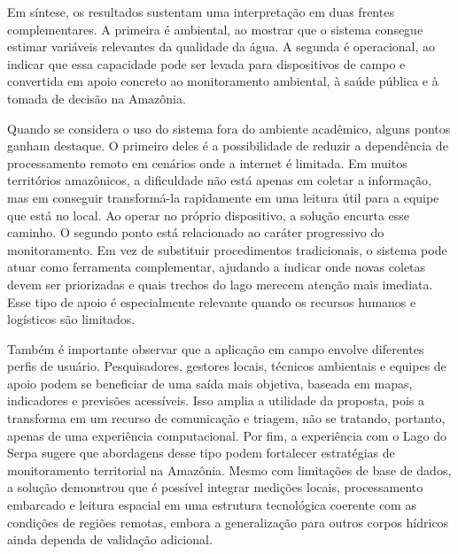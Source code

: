 Em s\'intese, os resultados sustentam uma interpreta\c{c}\~ao em duas frentes complementares. A primeira \'e ambiental, ao mostrar que o sistema consegue estimar vari\'aveis relevantes da qualidade da \'agua. A segunda \'e operacional, ao indicar que essa capacidade pode ser levada para dispositivos de campo e convertida em apoio concreto ao monitoramento ambiental, \`a sa\'ude p\'ublica e \`a tomada de decis\~ao na Amaz\^onia.


Quando se considera o uso do sistema fora do ambiente acad\^emico, alguns pontos ganham destaque. O primeiro deles \'e a possibilidade de reduzir a depend\^encia de processamento remoto em cen\'arios onde a internet \'e limitada. Em muitos territ\'orios amaz\^onicos, a dificuldade n\~ao est\'a apenas em coletar a informa\c{c}\~ao, mas em conseguir transform\'a-la rapidamente em uma leitura \'util para a equipe que est\'a no local. Ao operar no pr\'oprio dispositivo, a solu\c{c}\~ao encurta esse caminho. O segundo ponto est\'a relacionado ao car\'ater progressivo do monitoramento. Em vez de substituir procedimentos tradicionais, o sistema pode atuar como ferramenta complementar, ajudando a indicar onde novas coletas devem ser priorizadas e quais trechos do lago merecem aten\c{c}\~ao mais imediata. Esse tipo de apoio \'e especialmente relevante quando os recursos humanos e log\'isticos s\~ao limitados.

Tamb\'em \'e importante observar que a aplica\c{c}\~ao em campo envolve diferentes perfis de usu\'ario. Pesquisadores, gestores locais, t\'ecnicos ambientais e equipes de apoio podem se beneficiar de uma sa\'ida mais objetiva, baseada em mapas, indicadores e previs\~oes acess\'iveis. Isso amplia a utilidade da proposta, pois a transforma em um recurso de comunica\c{c}\~ao e triagem, n\~ao se tratando, portanto, apenas de uma experi\^encia computacional. Por fim, a experi\^encia com o Lago do Serpa sugere que abordagens desse tipo podem fortalecer estrat\'egias de monitoramento territorial na Amaz\^onia. Mesmo com limita\c{c}\~oes de base de dados, a solu\c{c}\~ao demonstrou que \'e poss\'ivel integrar medi\c{c}\~oes locais, processamento embarcado e leitura espacial em uma estrutura tecnol\'ogica coerente com as condi\c{c}\~oes de regi\~oes remotas, embora a generaliza\c{c}\~ao para outros corpos h\'idricos ainda dependa de valida\c{c}\~ao adicional.
